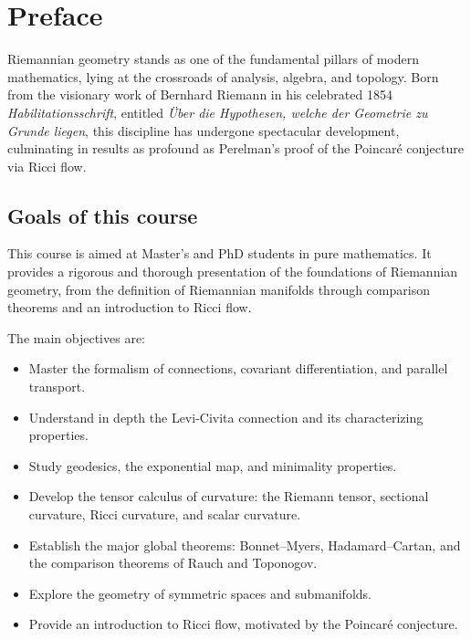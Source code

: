 \chapter*{Preface}

Riemannian geometry stands as one of the fundamental pillars of modern mathematics,
lying at the crossroads of analysis, algebra, and topology. Born from the visionary
work of Bernhard Riemann in his celebrated 1854 \emph{Habilitationsschrift}, entitled
\emph{\"Uber die Hypothesen, welche der Geometrie zu Grunde liegen}, this discipline
has undergone spectacular development, culminating in results as profound as
Perelman's proof of the Poincar\'e conjecture via Ricci flow.

\section*{Goals of this course}

This course is aimed at Master's and PhD students in pure mathematics. It provides
a rigorous and thorough presentation of the foundations of Riemannian geometry,
from the definition of Riemannian manifolds through comparison theorems and an
introduction to Ricci flow.

The main objectives are:
\begin{itemize}
    \item Master the formalism of connections, covariant differentiation, and
          parallel transport.
    \item Understand in depth the Levi-Civita connection and its characterizing
          properties.
    \item Study geodesics, the exponential map, and minimality properties.
    \item Develop the tensor calculus of curvature: the Riemann tensor, sectional
          curvature, Ricci curvature, and scalar curvature.
    \item Establish the major global theorems: Bonnet--Myers, Hadamard--Cartan,
          and the comparison theorems of Rauch and Toponogov.
    \item Explore the geometry of symmetric spaces and submanifolds.
    \item Provide an introduction to Ricci flow, motivated by the Poincar\'e
          conjecture.
\end{itemize}

